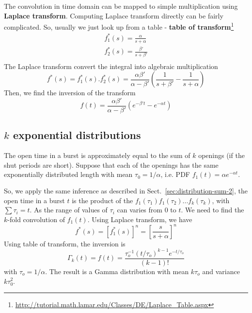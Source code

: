 \begin{framed}
The convolution in time domain can be mapped to simple multiplication
using {\bf Laplace transform}. Computing Laplace transform directly
can be fairly complicated. So, usually we just look up from a table -
{\bf table of transform}\footnote{\url{http://tutorial.math.lamar.edu/Classes/DE/Laplace_Table.aspx}}
\begin{equation}
  \label{eq:918}
  \begin{split}
    f_1^*(s) = \frac{\alpha}{s+\alpha} \\
    f_2^*(s) = \frac{\beta'}{s+\beta'} \\
  \end{split}
\end{equation}
The Laplace transform convert the integral into algebraic
multiplication
\begin{equation}
  \label{eq:919}
  f^*(s) = f_1^*(s).f_2^*(s) =
  \frac{\alpha\beta'}{\alpha-\beta'}\left(
    \frac{1}{s+\beta'}-\frac{1}{s+\alpha}\right)
\end{equation}
Then, we find the inversion of the transform
\begin{equation}
  \label{eq:920}
  f(t) =  \frac{\alpha\beta'}{\alpha-\beta'}\left(
    e^{-\beta' t}- e^{-\alpha t}\right)
\end{equation}
\end{framed}



\subsection{ $k$ exponential distributions}
\label{sec:distribution-sum-k}

The open time in a burst is approximately equal to the sum of $k$
openings (if the shut periods are short). Suppose that each of the
openings has the same exponentially distributed length with mean
$\tau_0=1/\alpha$, i.e. PDF $f_1(t) = \alpha e^{-\alpha t}$.


So, we apply the same inference as described in
Sect.~\ref{sec:distribution-sum-2}, the open time in a burst $t$ is
the product of the $f_1(\tau_1)f_1(\tau_2)...f_k(\tau_k)$, with $\sum
\tau_i = t$. As the range of values of $\tau_i$ can varies from $0$ to
$t$. We need to find the $k$-fold convolution of $f_1(t)$. Using
Laplace transform, we have
\begin{equation}
  \label{eq:922}
  f^*(s) = \left[ f^*_1(s)\right]^n = \left[\frac{s}{s+\alpha}\right]^n
\end{equation}
Using table of transform, the inversion is
\begin{equation}
  \label{eq:884}
  \Gamma_k(t) = f(t) = \frac{\tau_o^{-1}(t/\tau_o)^{k-1}e^{-t/\tau_o}}{(k-1)!}
\end{equation}
with $\tau_o=1/\alpha$. The result is a Gamma distribution with mean
$k\tau_o$ and variance $k\tau_0^2$.

